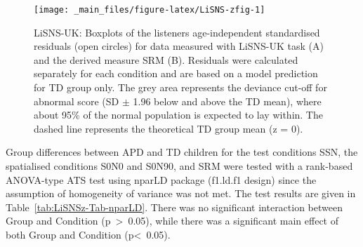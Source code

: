 \documentclass[a4paper, twoside]{templates/ociamthesis}
\begin{document}
\begin{figure}

{\centering \texttt{[image: \_main\_files/figure-latex/LiSNS-zfig-1]} 

}

\caption{LiSNS-UK: Boxplots of the listeners age-independent standardised residuals (open circles) for data measured with LiSNS-UK task (A) and the derived measure SRM (B). Residuals were calculated separately for each condition and are based on a model prediction for TD group only. The grey area represents the deviance cut-off for abnormal score (SD $\pm$ 1.96 below and above the TD mean), where about 95\% of the normal population is expected to lay within. The dashed line represents the theoretical TD group mean (z = 0).}\label{fig:LiSNS-zfig}
\end{figure}

\begin{table}

\caption{\label{tab:LiSNS-ztab}LiSNS-UK standard residuals (z-scores) descriptives by group. abnormal: defined as the percentage of abnormal z-score $>$ 1.96 (SSN, S0N0, \& S0N90) and z-score $<$ 1.96 (SRM).}
\centering
{}
\end{table}

Group differences between APD and TD children for the test conditions SSN, the spatialised conditions S0N0 and S0N90, and SRM were tested with a rank-based ANOVA-type ATS test using nparLD package (f1.ld.f1 design) since the assumption of homogeneity of variance was not met. The test results are given in Table~\ref{tab:LiSNSz-Tab-nparLD}. There was no significant interaction between Group and Condition (p~\textgreater~0.05), while there was a significant main effect of both Group and Condition (p\textless~0.05).\\
\end{document}
